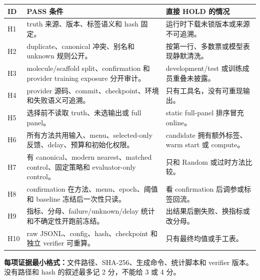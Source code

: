 \documentclass[10pt,letterpaper]{article}
\newcommand{\sect}[1]{\vspace{4pt}{\large\bfseries\color{GuideBlue}#1}\par\vspace{2pt}}
\newenvironment{clean}{\begin{center}\fontsize{8.55}{10.05}\selectfont\setlength{\tabcolsep}{3.7pt}\renewcommand{\arraystretch}{1.04}}{\end{center}}
\begin{document}
\newpage
\sect{4. H1--H10 硬条件清单}
\begin{clean}
\begin{tabular}{@{}p{.07\linewidth}p{.39\linewidth}p{.41\linewidth}@{}}
\toprule
ID & PASS 条件 & 直接 HOLD 的情况\\
\midrule
H1 & truth 来源、版本、标签语义和 hash 固定。 & 运行时下载未锁版本或来源不可追溯。\\
H2 & duplicate、canonical 冲突、别名和 unknown 规则公开。 & 按第一行、多数票或模型表现静默清洗。\\
H3 & molecule/scaffold split、confirmation 和 provider training exposure 分开审计。 & development/test 或训练成员重叠未披露。\\
H4 & provider 源码、commit、checkpoint、环境和失败语义可追溯。 & 只有工具名，没有可重现输出。\\
H5 & 选择前不读取 truth、未选输出或 full panel。 & static full-panel 排序冒充 online。\\
H6 & 所有方法共用输入、menu、selected-only 反馈、delay、预算和初始化权限。 & candidate 拥有额外标签、warm start 或 compute。\\
H7 & 有 canonical、modern nearest、matched control、固定策略和 evaluator-only control。 & 只和 Random 或过时方法比较。\\
H8 & confirmation 在方法、menu、epoch、阈值和 baseline 冻结后一次性只读。 & 看 confirmation 后调参或标签回流。\\
H9 & 指标、分母、failure/unknown/delay 统计和不确定性开跑前冻结。 & 出结果后删失败、换指标或改分母。\\
H10 & raw JSONL、config、hash、checkpoint 和独立 verifier 可重算。 & 只有最终均值或手工表。\\
\bottomrule
\end{tabular}
\end{clean}
\textbf{每项证据最小格式：}文件路径、SHA-256、生成命令、统计脚本和 verifier 版本。没有路径和 hash 的叙述最多记 2 分，不能给 3 或 4 分。
\end{document}
